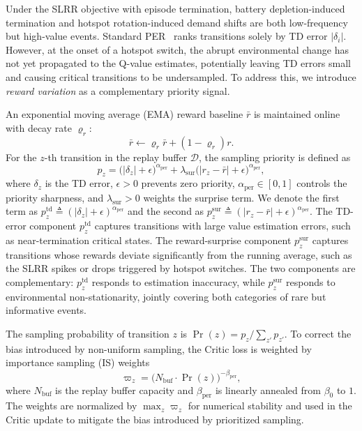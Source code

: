 \documentclass[journal]{IEEEtran}
\begin{document}
Under the SLRR objective with episode termination,
battery depletion-induced termination
and hotspot rotation-induced demand shifts are both low-frequency but
high-value events.
Standard PER~\cite{schaul2016per} ranks transitions solely by
TD error $|\delta_i|$.
However, at the onset of a hotspot switch, the abrupt environmental change
has not yet propagated to the Q-value estimates,
potentially leaving TD errors small and causing critical transitions
to be undersampled.
To address this, we introduce \emph{reward variation} as a complementary
priority signal.

An exponential moving average (EMA) reward baseline $\bar{r}$ is maintained
online with decay rate $\varrho_r$:
\begin{equation}\label{eq:ema}
  \bar{r} \leftarrow \varrho_r \bar{r} + (1 - \varrho_r) r.
\end{equation}
For the $z$-th transition in the replay buffer $\mathcal{D}$, the sampling
priority is defined as
\begin{equation}\label{eq:dual_priority}
  p_z = \bigl(|\delta_z| + \epsilon\bigr)^{\alpha_{\mathrm{per}}}
  + \lambda_{\mathrm{sur}}
  \bigl(|r_z - \bar{r}| + \epsilon\bigr)^{\alpha_{\mathrm{per}}},
\end{equation}
where $\delta_z$ is the TD error, $\epsilon>0$ prevents zero priority,
$\alpha_{\mathrm{per}}\in[0,1]$ controls the priority sharpness, and
$\lambda_{\mathrm{sur}}>0$ weights the surprise term. We denote the first term
as $p_z^{\mathrm{td}}\triangleq(|\delta_z|+\epsilon)^{\alpha_{\mathrm{per}}}$
and the second as
$p_z^{\mathrm{sur}}\triangleq(|r_z-\bar{r}|+\epsilon)^{\alpha_{\mathrm{per}}}$.
The TD-error component $p_z^{\mathrm{td}}$ captures transitions with large
value estimation errors, such as near-termination critical states. The
reward-surprise component $p_z^{\mathrm{sur}}$ captures transitions whose
rewards deviate significantly from the running average, such as the SLRR spikes
or drops triggered by hotspot switches. The two components are complementary:
$p_z^{\mathrm{td}}$ responds to estimation inaccuracy, while
$p_z^{\mathrm{sur}}$ responds to environmental non-stationarity, jointly
covering both categories of rare but informative events.

The sampling probability of transition $z$ is
$\Pr(z)=p_z/\sum_{z'}p_{z'}$. To correct the bias introduced by non-uniform
sampling, the Critic loss is weighted by importance sampling (IS) weights
\begin{equation}\label{eq:is_weight}
  \varpi_z = \bigl(N_{\mathrm{buf}}\cdot \Pr(z)\bigr)^{-\beta_{\mathrm{per}}},
\end{equation}
where $N_{\mathrm{buf}}$ is the replay buffer capacity and
$\beta_{\mathrm{per}}$ is linearly annealed from $\beta_0$ to $1$. The weights
are normalized by $\max_z\varpi_z$ for numerical stability and used in the
Critic update to mitigate the bias introduced by prioritized sampling.
\end{document}
